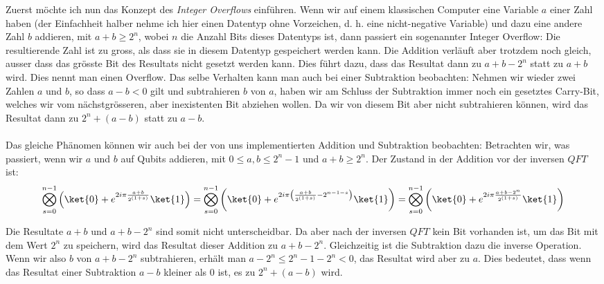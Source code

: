 Zuerst möchte ich nun das Konzept des \textit{Integer Overflows} einführen. Wenn wir auf einem klassischen Computer eine Variable $a$ einer Zahl haben (der Einfachheit halber nehme ich hier einen Datentyp ohne Vorzeichen, d. h. eine nicht-negative Variable) und dazu eine andere Zahl $b$ addieren, mit $a + b \geq 2^n$, wobei $n$ die Anzahl Bits dieses Datentyps ist, dann passiert ein sogenannter Integer Overflow: Die resultierende Zahl ist zu gross, als dass sie in diesem Datentyp gespeichert werden kann. Die Addition verläuft aber trotzdem noch gleich, ausser dass das grösste Bit des Resultats nicht gesetzt werden kann. Dies führt dazu, dass das Resultat dann zu $a + b - 2^n$ statt zu $a + b$ wird. 
Dies nennt man einen Overflow. Das selbe Verhalten kann man auch bei einer Subtraktion beobachten: Nehmen wir wieder zwei Zahlen $a$ und $b$, so dass $a - b < 0$ gilt und subtrahieren $b$ von $a$, haben wir am Schluss der Subtraktion immer noch ein gesetztes Carry-Bit, welches wir vom nächstgrösseren, aber inexistenten Bit abziehen wollen. Da wir von diesem Bit aber nicht subtrahieren können, wird das Resultat dann zu $2^n + (a - b)$ statt zu $a - b$.

\paragraph{}
Das gleiche Phänomen können wir auch bei der von uns implementierten Addition und Subtraktion beobachten: Betrachten wir, was passiert, wenn wir $a$ und $b$ auf Qubits addieren, mit $0 \leq a, b \leq 2^n - 1$ und $a + b \geq 2^n$. Der Zustand in der Addition vor der inversen $QFT$ ist: $$\bigotimes_{s = 0}^{n - 1}{\left( \ket{0} + e^{2i\pi\frac{a + b}{2^{(1 + s)}}}\ket{1} \right)} = \bigotimes_{s = 0}^{n - 1}{\left(\ket{0} + e^{2i\pi\left(\frac{a + b}{2^{(1 + s)}} - 2^{n - 1 - s}\right)}\ket{1} \right)} = \bigotimes_{s = 0}^{n - 1}{\left( \ket{0} + e^{2i\pi\frac{a + b - 2^n}{2^{(1 + s)}}}\ket{1} \right)}$$

Die Resultate $a + b$ und $a + b - 2^n$ sind somit nicht unterscheidbar. Da aber nach der inversen $QFT$ kein Bit vorhanden ist, um das Bit mit dem Wert $2^n$ zu speichern, wird das Resultat dieser Addition zu $a + b - 2^n$. Gleichzeitig ist die Subtraktion dazu die inverse Operation. Wenn wir also $b$ von $a + b - 2^n$ subtrahieren, erhält man $a - 2^n \leq 2^n - 1 - 2^n < 0$, das Resultat wird aber zu $a$. Dies bedeutet, dass wenn das Resultat einer Subtraktion $a - b$ kleiner als $0$ ist, es zu $2^n + (a - b)$ wird.

